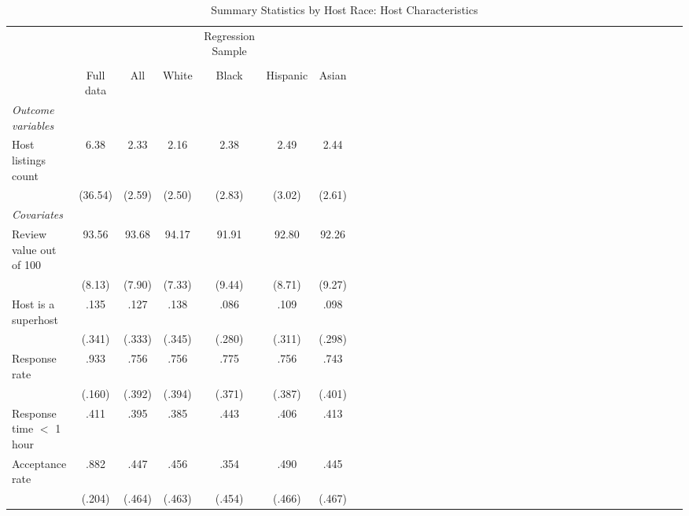 {
	\begin{longtable}{l*{6}{c|c|cccc}}
		\caption{Summary Statistics by Host Race: Host Characteristics}\\
		
		\hline
		&\multicolumn{1}{c}{}&\multicolumn{1}{c}{}&\multicolumn{1}{c}{}&\multicolumn{1}{c}{Regression Sample}&\multicolumn{1}{c}{}&\multicolumn{1}{c}{}\\
		\cline{3-7}\\
			&\multicolumn{1}{c}{Full data}&\multicolumn{1}{c}{All}&\multicolumn{1}{c}{White}&\multicolumn{1}{c}{Black}&\multicolumn{1}{c}{Hispanic}&\multicolumn{1}{c}{Asian}\\
		\hline\hline           
		     
		\textit{Outcome variables} \\
		
		Host listings count         & 6.38 &     2.33  &      2.16&      2.38 &    2.49  & 2.44 \\
		& (36.54)	&     (2.59)         &     (2.50)         &     (2.83)         &     (3.02) & 	(2.61)         \\
		
		\textit{Covariates} \\

		\hline
		Review value out of 100      & 93.56  &      93.68	&      94.17	 	&      91.91		&    92.80	 & 		92.26\\
		              &   (8.13)   &     (7.90)         &     (7.33)         &     (9.44)         &     (8.71) 	&	 (9.27)         \\
		
		Host is a superhost    & .135   &      .127		&      .138 &      .086 &      .109 	& 	.098\\
		&(.341) & (.333)     &     (.345)         &     (.280)         &     (.311)         &     (.298)         \\

		Response rate      & .933  &       .756		&       .756		&      .775         &      .756  	& 	.743\\
		& (.160) &     (.392)         &     (.394)         &     (.371)         &     (.387)         &		(.401)\\

		Response time $<$ 1 hour      & .411  &       .395		&       .385		&      .443         &      .406  	& 	.413\\
		[1em]
		Acceptance rate      & .882    &      .447&      .456&       .354         &      .490    &	.445     \\
		&(.204) &     (.464)         &     (.463)         &     (.454)         &     (.466)         &		(.467)\\


\end{longtable}}
